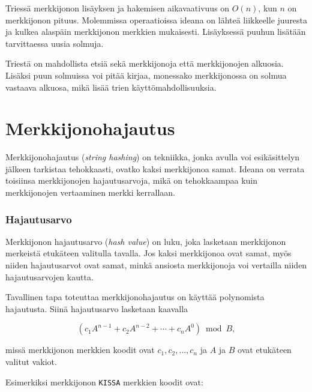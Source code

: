 Triessä merkkijonon lisäyksen ja hakemisen
aikavaativuus on $O(n)$, kun $n$ on merkkijonon pituus.
Molemmissa operaatioissa ideana on lähteä liikkeelle juuresta
ja kulkea alaspäin merkkijonon merkkien mukaisesti.
Lisäyksessä puuhun lisätään tarvittaessa
uusia solmuja.

Triestä on mahdollista etsiä
sekä merkkijonoja että merkkijonojen alkuosia.
Lisäksi puun solmuissa voi pitää kirjaa,
monessako merkkijonossa on solmua vastaava alkuosa,
mikä lisää trien käyttömahdollisuuksia.

\section{Merkkijonohajautus}

Merkkijonohajautus (\textit{string hashing})
on tekniikka, jonka avulla voi esikäsittelyn
jälkeen tarkistaa tehokkaasti, ovatko
kaksi merkkijonoa samat.
Ideana on verrata toisiinsa merkkijonojen hajautusarvoja,
mikä on tehokkaampaa kuin merkkijonojen
vertaaminen merkki kerrallaan.

\subsubsection*{Hajautusarvo}

Merkkijonon hajautusarvo (\textit{hash value})
on luku, joka lasketaan merkkijonon merkeistä
etukäteen valitulla tavalla.
Jos kaksi merkkijonoa ovat samat,
myös niiden hajautusarvot ovat samat,
minkä ansiosta merkkijonoja voi vertailla
niiden hajautusarvojen kautta.

Tavallinen tapa toteuttaa merkkijonohajautus
on käyttää polynomista hajautusta.
Siinä hajautusarvo lasketaan kaavalla

\[(c_1 A^{n-1} + c_2 A^{n-2} + \cdots + c_n A^0) \bmod B  ,\]

missä merkkijonon merkkien koodit ovat
$c_1,c_2,\ldots,c_n$ ja $A$ ja $B$ ovat etukäteen
valitut vakiot.

Esimerkiksi merkkijonon \texttt{KISSA} merkkien koodit ovat:
\begin{center}
\end{center}

